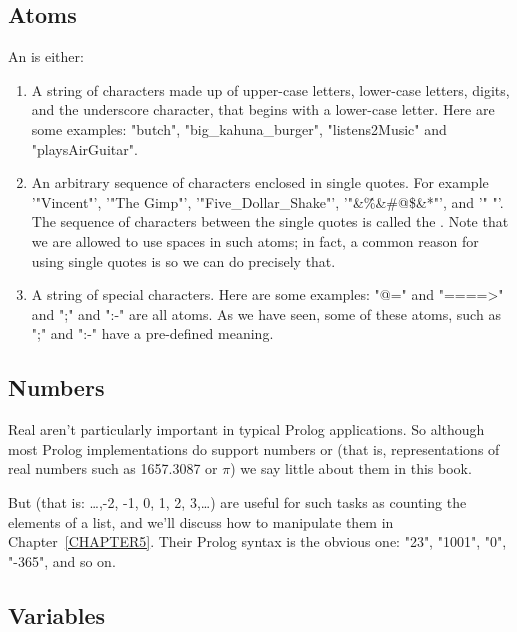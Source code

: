\subsection*{Atoms}\label{SUBSEC.L1.ATOMS}

An  is either:

\begin{enumerate}
\item{}A string of characters made up of upper-case letters,
  lower-case letters, digits, and the underscore character, that
  begins with a lower-case letter.  Here are some examples: "butch",
  "big\_kahuna\_burger", "listens2Music" and "playsAirGuitar".
\item{}An arbitrary sequence of characters enclosed in single quotes.
  For example '"Vincent"', '"The Gimp"', '"Five\_Dollar\_Shake"',
  '"\&\^\%\&\#@\$\&*"', and '" "'.
  The sequence of characters between the single quotes is called the .
  Note that we are allowed to use spaces in such
  atoms; in fact, a common reason for using single quotes is so we
  can do precisely that.
\item{}A string of special characters.  Here are some examples: "@=" and
  "====>" and ";" and ":-" are all atoms.  As we have seen, some of
  these atoms, such as ";" and ":-" have a pre-defined meaning.
\end{enumerate}


\subsection*{Numbers}\label{SUBSEC.L1.NUMBERS}


Real  aren't particularly important in typical Prolog
applications.  So although most Prolog implementations do support
 numbers or  (that is,
representations of real numbers such as 1657.3087 or $\pi$) we say
little about them in this book.

But  (that is: \ldots,-2, -1, 0, 1, 2, 3,\ldots) are
useful for such tasks as counting the elements of a list, and we'll
discuss how to manipulate them in Chapter~\ref{CHAPTER5}. Their Prolog
syntax is the obvious one: "23", "1001", "0", "-365", and so on.


\subsection*{Variables}\label{SUBSEC.L1.VARS}


